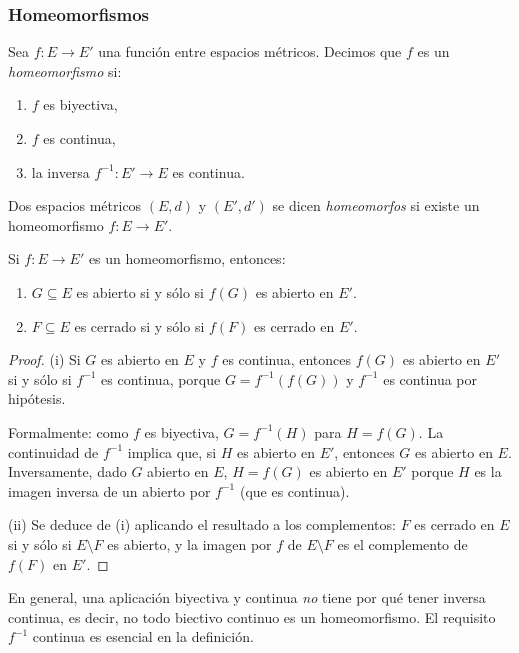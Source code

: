\subsubsection{Homeomorfismos}

\begin{defi}
Sea $f : E \to E'$ una función entre espacios métricos.
Decimos que $f$ es un \emph{homeomorfismo} si:
\begin{enumerate}[label=(\roman*)]
    \item $f$ es biyectiva,
    \item $f$ es continua,
    \item la inversa $f^{-1} : E' \to E$ es continua.
\end{enumerate}
\end{defi}

\begin{defi}
Dos espacios métricos $(E,d)$ y $(E',d')$ se dicen \emph{homeomorfos}
si existe un homeomorfismo $f : E \to E'$.
\end{defi}

\begin{prop}
Si $f : E \to E'$ es un homeomorfismo, entonces:
\begin{enumerate}[label=(\roman*)]
    \item $G \subseteq E$ es abierto si y sólo si $f(G)$ es abierto en $E'$.
    \item $F \subseteq E$ es cerrado si y sólo si $f(F)$ es cerrado en $E'$.
\end{enumerate}
\end{prop}

\begin{proof}
(i) Si $G$ es abierto en $E$ y $f$ es continua, entonces
$f(G)$ es abierto en $E'$ si y sólo si $f^{-1}$ es continua,
porque $G = f^{-1}(f(G))$ y $f^{-1}$ es continua por hipótesis.

Formalmente: como $f$ es biyectiva, $G = f^{-1}(H)$ para $H = f(G)$.
La continuidad de $f^{-1}$ implica que, si $H$ es abierto en $E'$,
entonces $G$ es abierto en $E$. Inversamente, dado $G$ abierto en $E$,
$H=f(G)$ es abierto en $E'$ porque $H$ es la imagen inversa de un
abierto por $f^{-1}$ (que es continua).

(ii) Se deduce de (i) aplicando el resultado a los complementos:
$F$ es cerrado en $E$ si y sólo si $E \setminus F$ es abierto, y
la imagen por $f$ de $E \setminus F$ es el complemento de $f(F)$ en $E'$.
\end{proof}

\begin{obs}
En general, una aplicación biyectiva y continua \emph{no} tiene por qué
tener inversa continua, es decir, no todo biectivo continuo es un
homeomorfismo. El requisito $f^{-1}$ continua es esencial en la definición.
\end{obs}

